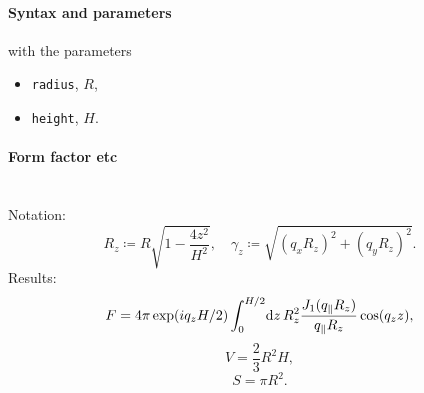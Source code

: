 \FloatBarrier

\paragraph{Syntax and parameters}
\begin{quote}
\end{quote}
with the parameters
\begin{itemize}
\item \texttt{radius}, $R$,
\item \texttt{height}, $H$.
\end{itemize}


\paragraph{Form factor etc}\strut\\
Notation:
\begin{equation*}
 R_z \coloneqq R\sqrt{1-\frac{4z^2}{H^2}},\quad
 \gamma_z \coloneqq \sqrt{(q_x R_z)^2+(q_y R_z)^2}.  
\end{equation*}
Results:
\begin{equation*}
  F = 4\pi \exp(i q_z H/2) \int_0^{H/2} \!\text{d} z\,
     R_z^2 \frac{J_1(q_{\parallel}R_z)}{q_{\parallel}R_z} \cos(q_z z),
\end{equation*}
\begin{equation*}
  V =\dfrac{2}{3}R^2H,
\end{equation*}
\begin{equation*}
  S =\pi R^2.
\end{equation*}

